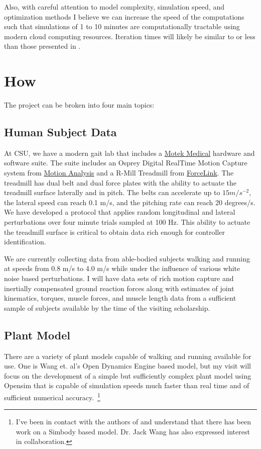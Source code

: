 \documentclass[11pt,twocolumn]{article}
\begin{document}
Also, with careful attention to model complexity, simulation speed, and
optimization methods I believe we can increase the speed of the computations
such that simulations of 1 to 10 minutes are computationally tractable using
modern cloud computing resources. Iteration times will likely be similar to or
less than those presented in \cite{Wang2012}.

\section*{How}

The project can be broken into four main topics:

\subsection*{Human Subject Data}

At CSU, we have a modern gait lab that includes a
\href{http://www.motekmedical.com}{Motek Medical} hardware and software suite.
The suite includes an Osprey Digital RealTime Motion Capture system from
\href{http://www.motionanalysis.com}{Motion Analysis} and a R-Mill Treadmill
from \href{http://www.forcelink.nl}{ForceLink}. The treadmill has dual belt and
dual force plates with the ability to actuate the treadmill surface laterally
and in pitch. The belts can accelerate up to $15 m/s^{-2}$, the lateral speed
can reach 0.1 m/s, and the pitching rate can reach 20 degrees/s. We have
developed a protocol that applies random longitudinal and lateral perturbations
over four minute trials sampled at 100 Hz. This ability to actuate the
treadmill surface is critical to obtain data rich enough for controller
identification.


We are currently collecting data from able-bodied subjects walking and running
at speeds from 0.8 m/s to 4.0 m/s while under the influence of various white
noise based perturbations. I will have data sets of rich motion capture and
inertially compensated ground reaction forces along with estimates of joint
kinematics, torques, muscle forces, and muscle length data from a sufficient
sample of subjects available by the time of the visiting scholarship.

\subsection*{Plant Model}
There are a variety of plant models capable of walking and running available
for use. One is Wang et. al's Open Dynamics Engine based model, but my visit
will focus on the development of a simple but sufficiently complex plant model
using Opensim that is capable of simulation speeds much faster than real time
and of sufficient numerical accuracy.~\footnote{I've been in contact with the
  authors of \cite{Wang2012} and understand that there has been work on a
  Simbody based model. Dr. Jack Wang has also expressed interest in
collaboration.}
\end{document}

